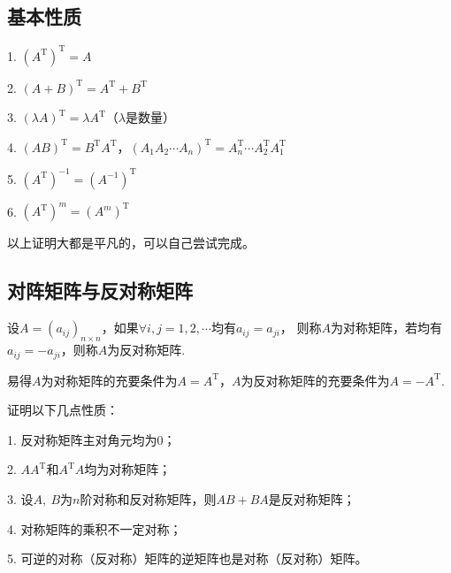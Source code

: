 \subsection{基本性质}
1. $(A^\mathrm{T})^\mathrm{T}=A$

2. $(A+B)^\mathrm{T}=A^\mathrm{T}+B^\mathrm{T}$

3. $(\lambda A)^\mathrm{T}=\lambda A^\mathrm{T}$（$\lambda$是数量）

4. $(AB)^\mathrm{T}=B^\mathrm{T}A^\mathrm{T}$，$(A_1A_2\cdots A_n)^\mathrm{T}=A_n^\mathrm{T}\cdots A_2^\mathrm{T}A_1^\mathrm{T}$

5. $(A^\mathrm{T})^{-1}=(A^{-1})^\mathrm{T}$

6. $(A^\mathrm{T})^m=(A^m)^\mathrm{T}$

以上证明大都是平凡的，可以自己尝试完成。
\subsection{对阵矩阵与反对称矩阵}
\begin{definition}
	设$A=(a_{ij})_{n \times n}$，如果$\forall i,j=1,2,\cdots$均有$a_{ij}=a_{ji}$，
	则称$A$为对称矩阵，若均有$a_{ij}=-a_{ji}$，则称$A$为反对称矩阵.
\end{definition}
易得$A$为对称矩阵的充要条件为$A=A^\mathrm{T}$，$A$为反对称矩阵的充要条件为$A=-A^\mathrm{T}$.
\begin{example}
	证明以下几点性质：
	
	\textup{1. }反对称矩阵主对角元均为$0$\textup{；}
	
	\textup{2. }$AA^\mathrm{T}$和$A^\mathrm{T}A$均为对称矩阵\textup{；}
	
	\textup{3. }设$A,\ B$为$n$阶对称和反对称矩阵，则$AB+BA$是反对称矩阵\textup{；}
	
	\textup{4. }对称矩阵的乘积不一定对称\textup{；}
	
	\textup{5. }可逆的对称（反对称）矩阵的逆矩阵也是对称（反对称）矩阵。
\end{example}

